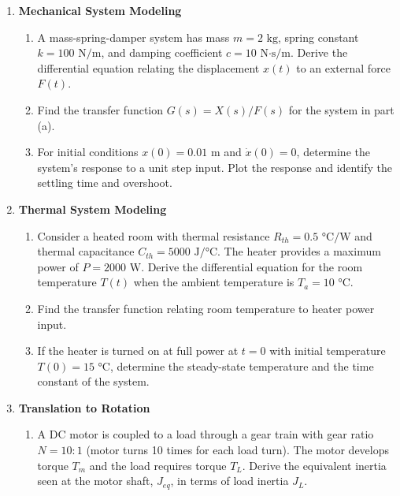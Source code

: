 \begin{enumerate}
\begin{enumerate}
\item A passive RC low-pass filter has $R = 10\text{ k}\Omega$ and $C = 1\text{ \mu F}$. Determine the cutoff frequency in radians per second and hertz. If the input is a unit step function, find the expression for the output voltage $v_o(t)$.

\end{enumerate}

\item \textbf{Mechanical System Modeling}
\begin{enumerate}
\item A mass-spring-damper system has mass $m = 2\text{ kg}$, spring constant $k = 100\text{ N/m}$, and damping coefficient $c = 10\text{ N·s/m}$. Derive the differential equation relating the displacement $x(t)$ to an external force $F(t)$.

\item Find the transfer function $G(s) = X(s)/F(s)$ for the system in part (a).

\item For initial conditions $x(0) = 0.01\text{ m}$ and $\dot{x}(0) = 0$, determine the system's response to a unit step input. Plot the response and identify the settling time and overshoot.

\end{enumerate}

\item \textbf{Thermal System Modeling}
\begin{enumerate}
\item Consider a heated room with thermal resistance $R_{th} = 0.5\text{ °C/W}$ and thermal capacitance $C_{th} = 5000\text{ J/°C}$. The heater provides a maximum power of $P = 2000\text{ W}$. Derive the differential equation for the room temperature $T(t)$ when the ambient temperature is $T_a = 10\text{ °C}$.

\item Find the transfer function relating room temperature to heater power input.

\item If the heater is turned on at full power at $t = 0$ with initial temperature $T(0) = 15\text{ °C}$, determine the steady-state temperature and the time constant of the system.

\end{enumerate}

\item \textbf{Translation to Rotation}
\begin{enumerate}
\item A DC motor is coupled to a load through a gear train with gear ratio $N = 10:1$ (motor turns 10 times for each load turn). The motor develops torque $T_m$ and the load requires torque $T_L$. Derive the equivalent inertia seen at the motor shaft, $J_{eq}$, in terms of load inertia $J_L$.


\end{enumerate}
\end{enumerate}
